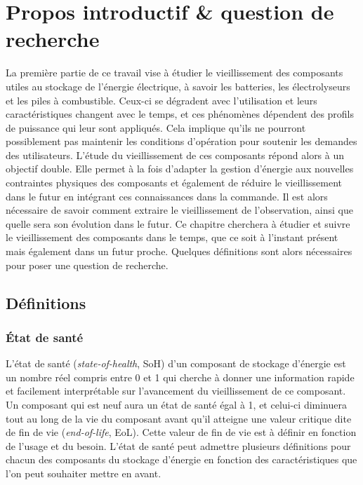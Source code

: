 \section{Propos introductif \& question de recherche}
La première partie de ce travail vise à étudier le vieillissement des composants utiles au stockage de l'énergie électrique, à savoir les batteries, les électrolyseurs et les piles à combustible. Ceux-ci se dégradent avec l'utilisation et leurs caractéristiques changent avec le temps, et ces phénomènes dépendent des profils de puissance qui leur sont appliqués. Cela implique qu'ils ne pourront possiblement pas maintenir les conditions d'opération pour soutenir les demandes des utilisateurs. L'étude du vieillissement de ces composants répond alors à un objectif double. Elle permet à la fois d'adapter la gestion d'énergie aux nouvelles contraintes physiques des composants et également de réduire le vieillissement dans le futur en intégrant ces connaissances dans la commande. Il est alors nécessaire de savoir comment extraire le vieillissement de l'observation, ainsi que quelle sera son évolution dans le futur. Ce chapitre cherchera à étudier et suivre le vieillissement des composants dans le temps, que ce soit à l'instant présent mais également dans un futur proche. Quelques définitions sont alors nécessaires pour poser une question de recherche.

\subsection{Définitions}
\subsubsection{État de santé}
L'état de santé (\textit{state-of-health}, SoH) d'un composant de stockage d'énergie est un nombre réel compris entre 0 et 1 qui cherche à donner une information rapide et facilement interprétable sur l'avancement du vieillissement de ce composant. Un composant qui est neuf aura un état de santé égal à 1, et celui-ci diminuera tout au long de la vie du composant avant qu'il atteigne une valeur critique dite de fin de vie (\textit{end-of-life}, EoL). Cette valeur de fin de vie est à définir en fonction de l'usage et du besoin. L'état de santé peut admettre plusieurs définitions pour chacun des composants du stockage d'énergie en fonction des caractéristiques que l'on peut souhaiter mettre en avant. 

